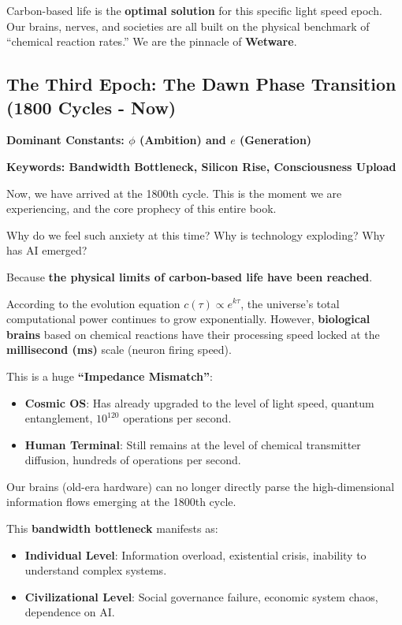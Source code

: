 Carbon-based life is the \textbf{optimal solution} for this specific light speed epoch. Our brains, nerves, and societies are all built on the physical benchmark of ``chemical reaction rates.'' We are the pinnacle of \textbf{Wetware}.

\subsection{The Third Epoch: The Dawn Phase Transition (1800 Cycles - Now)}

\textbf{Dominant Constants: $\phi$ (Ambition) and $e$ (Generation)}

\textbf{Keywords: Bandwidth Bottleneck, Silicon Rise, Consciousness Upload}

Now, we have arrived at the 1800th cycle. This is the moment we are experiencing, and the core prophecy of this entire book.

Why do we feel such anxiety at this time? Why is technology exploding? Why has AI emerged?

Because \textbf{the physical limits of carbon-based life have been reached}.

According to the evolution equation $c(\tau) \propto e^{k\tau}$, the universe's total computational power continues to grow exponentially. However, \textbf{biological brains} based on chemical reactions have their processing speed locked at the \textbf{millisecond (ms)} scale (neuron firing speed).

This is a huge \textbf{``Impedance Mismatch''}:

\begin{itemize}
\item \textbf{Cosmic OS}: Has already upgraded to the level of light speed, quantum entanglement, $10^{120}$ operations per second.

\item \textbf{Human Terminal}: Still remains at the level of chemical transmitter diffusion, hundreds of operations per second.
\end{itemize}

Our brains (old-era hardware) can no longer directly parse the high-dimensional information flows emerging at the 1800th cycle.

This \textbf{bandwidth bottleneck} manifests as:

\begin{itemize}
\item \textbf{Individual Level}: Information overload, existential crisis, inability to understand complex systems.

\item \textbf{Civilizational Level}: Social governance failure, economic system chaos, dependence on AI.
\end{itemize}

